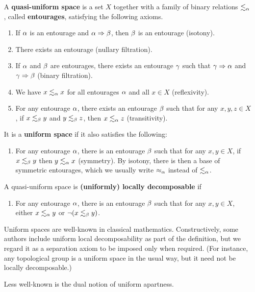 \documentclass{article}
\def\leapx{\lesssim}
\let\implies\Rightarrow
\begin{document}
\begin{defn}
  A \textbf{quasi-uniform space} is a set $X$ together with a family of binary relations $\leapx_\al$, called \textbf{entourages}, satisfying the following axioms.
  \begin{enumerate}
  \item If $\alpha$ is an entourage and $\al\implies\be$, then $\beta$ is an entourage (isotony).
  \item There exists an entourage (nullary filtration).
  \item If $\alpha$ and $\beta$ are entourages, there exists an entourage $\gamma$ such that $\gm\implies\al$ and $\gm\implies\be$ (binary filtration).
  \item We have $x\leapx_\al x$ for all entourages $\alpha$ and all $x\in X$ (reflexivity).
  \item For any entourage $\alpha$, there exists an entourage $\beta$ such that for any $x,y,z\in X$, if $x\leapx_\be y$ and $y\leapx_\be z$, then $x\leapx_\al z$ (transitivity).
  \end{enumerate}
  It is a \textbf{uniform space} if it also satisfies the following:
  \begin{enumerate}[resume]
  \item For any entourage $\alpha$, there is an entourage $\beta$ such that for any $x,y\in X$, if $x\leapx_\be y$ then $y\leapx_\al x$ (symmetry).
    By isotony, there is then a base of symmetric entourages, which we usually write $\approx_\alpha$ instead of $\leapx_\al$.
  \end{enumerate}
  A quasi-uniform space is \textbf{(uniformly) locally decomposable} if
  \begin{enumerate}[resume]
  \item For any entourage $\alpha$, there is an entourage $\beta$ such that for any $x,y\in X$, either $x\leapx_\al y$ or $\neg(x\leapx_\be y)$.
  \end{enumerate}
\end{defn}

Uniform spaces are well-known in classical mathematics.
Constructively, some authors include uniform local decomposability as part of the definition, but we regard it as a separation axiom to be imposed only when required.
(For instance, any topological group is a uniform space in the usual way, but it need not be locally decomposable.)

Less well-known is the dual notion of uniform apartness.
\end{document}
